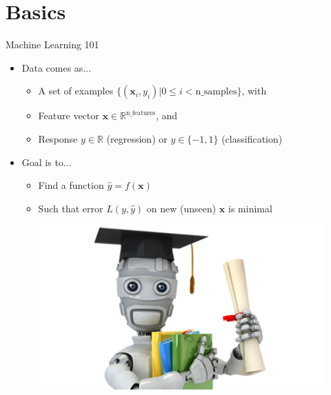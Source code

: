 \documentclass[a4paper,presentation]{beamer}
\begin{document}


\section{Basics}

\begin{frame}{Machine Learning 101}
  \begin{itemize}
  \item Data comes as...
    \begin{itemize}
        \vspace{0.2cm}
        \item A set of examples $\{(\mathbf{x}_i, y_i) | 0 \leq i < \text{n\_samples}\}$, with
        \vspace{0.2cm}
        \item Feature vector $\mathbf{x} \in \mathbb{R}^\text{n\_features}$, and
        \vspace{0.2cm}
        \item Response $y \in \mathbb{R}$ (regression) or $y \in \{-1, 1\}$ (classification)
    \end{itemize}
  \vspace{0.5cm}
  \item Goal is to...
    \begin{itemize}
        \vspace{0.2cm}
        \item Find a function $\hat{y} = f(\mathbf{x})$
        \vspace{0.2cm}
        \item Such that error $L(y, \hat{y})$ on new (unseen) $\mathbf{x}$ is minimal
        \vspace{0.5cm}
    \end{itemize}
  \end{itemize}
  \vspace{-0.5cm}
  \begin{figure}
      \includegraphics[scale=0.2]{./images/ml-course.png}
    \end{figure}
\end{frame}
\end{document}
